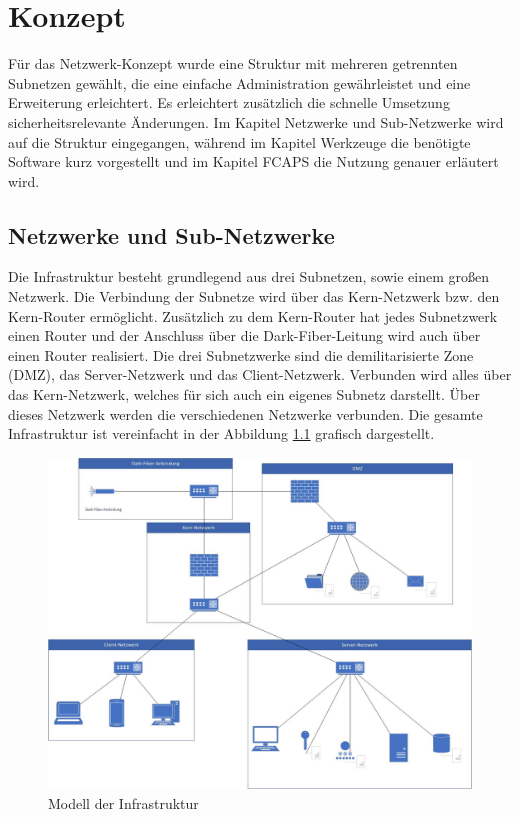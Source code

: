\chapter{Konzept}

Für das Netzwerk-Konzept wurde eine Struktur mit mehreren getrennten Subnetzen gewählt, die eine einfache Administration gewährleistet und eine Erweiterung erleichtert. Es erleichtert zusätzlich die schnelle Umsetzung sicherheitsrelevante Änderungen. Im Kapitel Netzwerke und Sub-Netzwerke wird auf die Struktur eingegangen, während im Kapitel Werkzeuge die benötigte Software kurz vorgestellt und im Kapitel FCAPS die Nutzung genauer erläutert wird.

\section{Netzwerke und Sub-Netzwerke}
Die Infrastruktur besteht grundlegend aus drei Subnetzen, sowie einem großen Netzwerk. Die Verbindung der Subnetze wird über das Kern-Netzwerk bzw. den Kern-Router ermöglicht. Zusätzlich zu dem Kern-Router hat jedes Subnetzwerk einen Router und der Anschluss über die Dark-Fiber-Leitung wird auch über einen Router realisiert. Die drei Subnetzwerke sind die demilitarisierte Zone (DMZ), das Server-Netzwerk und das Client-Netzwerk.
Verbunden wird alles über das Kern-Netzwerk, welches für sich auch ein eigenes Subnetz darstellt. Über dieses Netzwerk werden die verschiedenen Netzwerke verbunden. Die gesamte Infrastruktur ist vereinfacht in der Abbildung \ref{fig:model} grafisch dargestellt.

\begin{figure}
  \includegraphics[width=\linewidth]{pictures/netzwerk-diagramm.jpg}
  \caption{Modell der Infrastruktur}
  \label{fig:model}
\end{figure}

